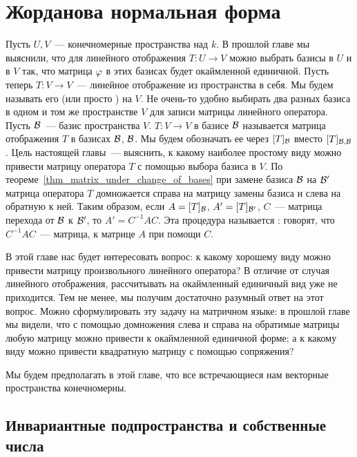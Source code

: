 \section{Жорданова нормальная форма}\label{subsect:jordan_form}

Пусть $U,V$~--- конечномерные пространства над $k$.
В прошлой главе мы выяснили, что для линейного отображения $T\colon
U\to V$ можно выбрать базисы в $U$ и в $V$ так, что матрица $\varphi$ в
этих базисах будет окаймленной единичной.
Пусть теперь $T\colon V\to V$~--- линейное отображение из
пространства в себя. Мы будем называть его  (или
просто ) на $V$.
Не очень-то удобно выбирать два разных базиса в
одном и том же пространстве $V$ для записи матрицы линейного
оператора. Пусть $\mathcal B$~--- базис пространства $V$.
 $T\colon V\to V$ в
базисе $\mathcal B$ называется
матрица отображения $T$ в базисах $\mathcal B$, $\mathcal B$.
Мы будем обозначать ее через $[T]_{\mathcal B}$ вместо $[T]_{\mathcal B,\mathcal B}$.
Цель настоящей главы~--- выяснить, к какому наиболее простому виду
можно привести матрицу
оператора $T$ с помощью выбора базиса в $V$.
По теореме~\ref{thm_matrix_under_change_of_bases} при замене базиса
$\mathcal B$ на $\mathcal B'$ матрица оператора $T$ домножается справа на матрицу
замены базиса и слева на обратную к ней. Таким образом, если
$A=[T]_{\mathcal B}$, $A'=[T]_{\mathcal B'}$, $C$~--- матрица перехода от $\mathcal
B$ к $\mathcal B'$, то $A'=C^{-1}AC$. Эта процедура называется
: говорят, что
$C^{-1}AC$~--- матрица,  к матрице $A$ при помощи
$C$.

В этой главе нас будет интересовать вопрос: к какому хорошему виду
можно привести матрицу произвольного линейного оператора? В отличие от
случая линейного отображения, рассчитывать на окаймленный единичный
вид уже не приходится. Тем не менее, мы получим достаточно разумный
ответ на этот вопрос. Можно сформулировать эту задачу на матричном
языке: в прошлой главе мы видели, что с помощью домножения слева и
справа на обратимые матрицы любую матрицу можно привести к окаймленной
единичной форме; а к какому виду можно привести квадратную матрицу с
помощью сопряжения?

Мы будем предполагать в этой главе, что все встречающиеся нам
векторные пространства конечномерны.

\subsection{Инвариантные подпространства и собственные числа}

